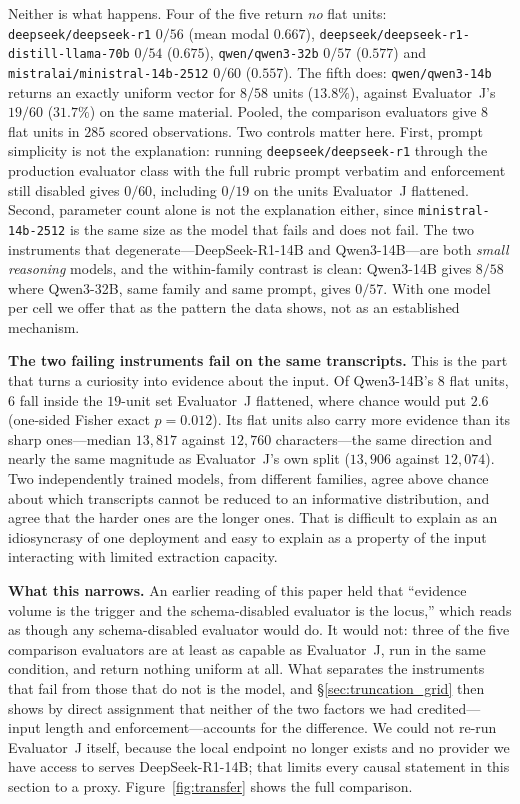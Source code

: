 \documentclass[11pt,journal,onecolumn]{IEEEtran}
\begin{document}
Neither is what happens. Four of the five return \emph{no} flat units: \texttt{deepseek/deepseek-r1} $0/56$ (mean modal $0.667$), \texttt{deepseek/deepseek-r1-distill-llama-70b} $0/54$ ($0.675$), \texttt{qwen/qwen3-32b} $0/57$ ($0.577$) and \texttt{mistralai/ministral-14b-2512} $0/60$ ($0.557$). The fifth does: \texttt{qwen/qwen3-14b} returns an exactly uniform vector for $8/58$ units ($13.8\%$), against Evaluator~J's $19/60$ ($31.7\%$) on the same material. Pooled, the comparison evaluators give $8$ flat units in $285$ scored observations. Two controls matter here. First, prompt simplicity is not the explanation: running \texttt{deepseek/deepseek-r1} through the production evaluator class with the full rubric prompt verbatim and enforcement still disabled gives $0/60$, including $0/19$ on the units Evaluator~J flattened. Second, parameter count alone is not the explanation either, since \texttt{ministral-14b-2512} is the same size as the model that fails and does not fail. The two instruments that degenerate---DeepSeek-R1-14B and Qwen3-14B---are both \emph{small reasoning} models, and the within-family contrast is clean: Qwen3-14B gives $8/58$ where Qwen3-32B, same family and same prompt, gives $0/57$. With one model per cell we offer that as the pattern the data shows, not as an established mechanism.

\textbf{The two failing instruments fail on the same transcripts.} This is the part that turns a curiosity into evidence about the input. Of Qwen3-14B's $8$ flat units, $6$ fall inside the $19$-unit set Evaluator~J flattened, where chance would put $2.6$ (one-sided Fisher exact $p = 0.012$). Its flat units also carry more evidence than its sharp ones---median $13{,}817$ against $12{,}760$ characters---the same direction and nearly the same magnitude as Evaluator~J's own split ($13{,}906$ against $12{,}074$). Two independently trained models, from different families, agree above chance about which transcripts cannot be reduced to an informative distribution, and agree that the harder ones are the longer ones. That is difficult to explain as an idiosyncrasy of one deployment and easy to explain as a property of the input interacting with limited extraction capacity.

\textbf{What this narrows.} An earlier reading of this paper held that ``evidence volume is the trigger and the schema-disabled evaluator is the locus,'' which reads as though any schema-disabled evaluator would do. It would not: three of the five comparison evaluators are at least as capable as Evaluator~J, run in the same condition, and return nothing uniform at all. What separates the instruments that fail from those that do not is the model, and \S\ref{sec:truncation_grid} then shows by direct assignment that neither of the two factors we had credited---input length and enforcement---accounts for the difference. We could not re-run Evaluator~J itself, because the local endpoint no longer exists and no provider we have access to serves DeepSeek-R1-14B; that limits every causal statement in this section to a proxy. Figure~\ref{fig:transfer} shows the full comparison.
\end{document}

